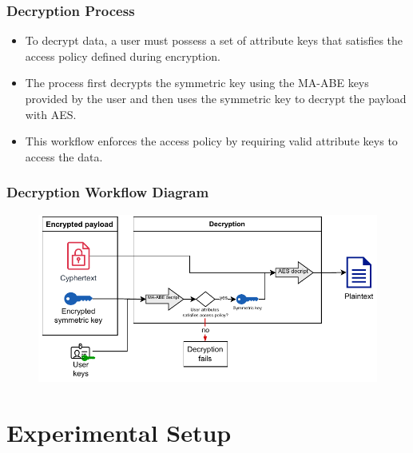 \documentclass{beamer}
\begin{document}
\begin{frame}
    \frametitle{Decryption Process}
    \begin{itemize}
        \item To decrypt data, a user must possess a set of attribute keys that satisfies the access policy defined during encryption.
        \item The process first decrypts the symmetric key using the MA-ABE keys provided by the user and then uses the symmetric key to decrypt the payload with AES.
        \item This workflow enforces the access policy by requiring valid attribute keys to access the data.
    \end{itemize}
\end{frame}

\begin{frame}
    \frametitle{Decryption Workflow Diagram}
    \begin{figure}
        \includegraphics[width=\textwidth,height=0.7\textheight,keepaspectratio]{images/diagrams/decryption_diagram.pdf}
    \end{figure}
\end{frame}


\section{Experimental Setup}
\end{document}
